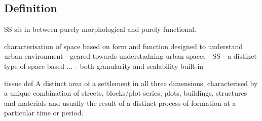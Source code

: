 \subsection{Definition}
\label{ssec:ss_def}






SS sit in between purely morphological and purely functional.

characterisation of space based on form and function designed to understand urban environment
- geared towards understadning urban spaces
- SS - a distinct type of space based ...
- both granularity and scalability built-in

tissue def
A distinct area of a settlement in all three dimensions, characterised by a unique combination of streets, blocks/plot series, plots, buildings, structures and materials and usually the result of a distinct process of formation at a particular time or period.











